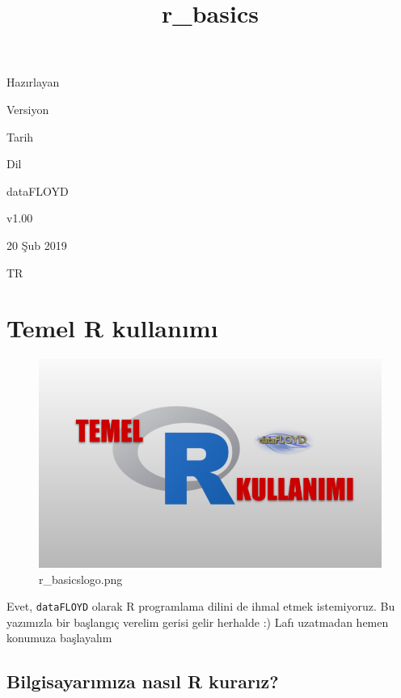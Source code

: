 \documentclass[11pt]{article}
\title{r\_basics}
\makeatletter
\def\maxwidth{\ifdim\Gin@nat@width>\linewidth\linewidth
    \else\Gin@nat@width\fi}
\let\Oldincludegraphics\includegraphics
\renewcommand{\includegraphics}[1]{\Oldincludegraphics[width=.8\maxwidth]{#1}}
\makeatother
\begin{document}
    
    
    \maketitle
    
    

    
    Hazırlayan

Versiyon

Tarih

Dil

dataFLOYD

v1.00

20 Şub 2019

TR

    \hypertarget{temel-r-kullanux131mux131}{%
\section{Temel R kullanımı}\label{temel-r-kullanux131mux131}}

    \begin{figure}
\centering
\includegraphics{r_basicslogo.png}
\caption{r\_basicslogo.png}
\end{figure}

    Evet, \texttt{dataFLOYD} olarak R programlama dilini de ihmal etmek
istemiyoruz. Bu yazımızla bir başlangıç verelim gerisi gelir herhalde :)
Lafı uzatmadan hemen konumuza başlayalım

    \hypertarget{bilgisayarux131mux131za-nasux131l-r-kurarux131z}{%
\subsection{Bilgisayarımıza nasıl R
kurarız?}\label{bilgisayarux131mux131za-nasux131l-r-kurarux131z}}
\end{document}

